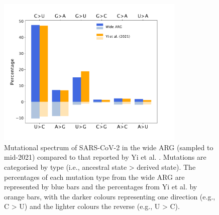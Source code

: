 \documentclass{article}
\begin{document}
\begin{figure} \centering
\includegraphics[width=0.8\textwidth]{figures/mutational_spectra.pdf}
\caption{\label{fig:mutational_spectra} Mutational spectrum of SARS-CoV-2 in
the wide ARG (sampled to mid-2021) compared to that reported by Yi et al.
\cite{Yi2021-sc}. Mutations are categorised by type (i.e., ancestral state >
derived state). The percentages of each mutation type from the wide ARG are
represented by blue bars and the percentages from Yi et al. by orange bars,
with the darker colours representing one direction (e.g., C > U) and the
lighter colours the reverse (e.g., U > C).} \end{figure}



\end{document}
